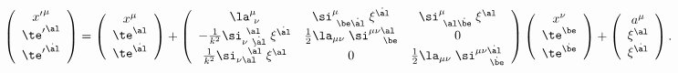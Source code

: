 \begin{equation} \label{modsp}
\left(\begin{array}{c} {x'}^\mu \\ {\te'}^\al \\ {\te'}^{\dot{\al}} \end{array}\right)
=\left(\begin{array}{c} x^\mu \\ \te^\al \\ \te^{\dot{\al}} \end{array}\right)+
\left(\begin{array}{ccc} \la^\mu_{\ \nu} & \si^\mu_{\ \be\dot{\al}}\;\xi^{\dot{\al}} & \si^\mu_{\ \al\dot{\be}}\;\xi^{\al} \\
-\frac{1}{k^2}\si_{\nu\ \dot{\al}}^{\ \al}\;\xi^{\dot{\al}} & \frac{1}{2}\la_{\mu\nu}\;\si^{\mu\nu\al}_{\ \ \ \,\be} & 0 \\
\frac{1}{k^2}\si_{\nu\al}^{\ \ \;\dot{\al}}\;\xi^\al & 0 & \frac{1}{2}\la_{\mu\nu}\;\si^{\mu\nu\dot{\al}}_{\ \ \ \,\dot{\be}} \end{array}\right)
\left(\begin{array}{c} x^\nu \\ \te^\be \\ \te^{\dot{\be}} \end{array}\right) +
\left(\begin{array}{c} a^\mu \\ \xi^\al \\ \xi^{\dot{\al}} \end{array}\right).
 \end{equation}

